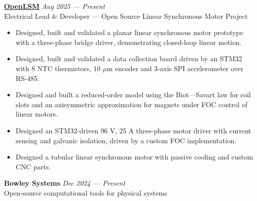 \documentclass[11pt,a4paper]{article}
\begin{document}
\noindent\textbf{\href{https://github.com/wgbowley/openLSM}{OpenLSM}} \hfill \textit{Aug 2025 --- Present} \\
Electrical Lead \& Developer --- Open Source Linear Synchronous Motor Project
\begin{itemize}[leftmargin=*, noitemsep, topsep=2pt]
\item Designed, built and validated a planar linear synchronous motor prototype with a three-phase bridge driver, demonstrating closed-loop linear motion.
\item Designed, built and validated a data collection board driven by an STM32 with 8 NTC thermistors, 10 $\mu$m encoder and 3-axis SPI accelerometer over RS-485.
\item Designed and built a reduced-order model using the Biot---Savart law for coil slots and an axisymmetric approximation for magnets under FOC control of linear motors.
\item Designed an STM32-driven 96 V, 25 A three-phase motor driver with current sensing and galvanic isolation, driven by a custom FOC implementation.
\item Designed a tubular linear synchronous motor with passive cooling and custom CNC parts.
\end{itemize}

\noindent\textbf{Bowley Systems} \hfill \textit{Dec 2024 --- Present} \\
Open-source computational tools for physical systems
\end{document}
